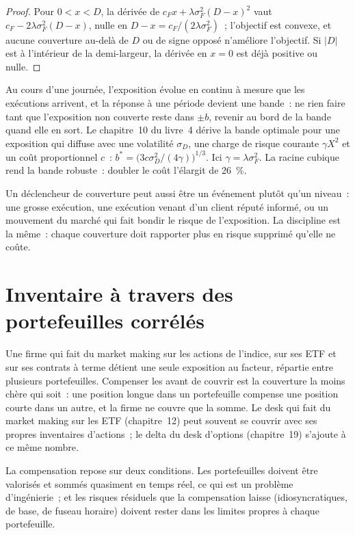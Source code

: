 \begin{proof}
Pour $0<x<D$, la dérivée de $c_Fx+\lambda\sigma_F^2(D-x)^2$ vaut $c_F-2\lambda\sigma_F^2(D-x)$, nulle en $D-x=c_F/(2\lambda\sigma_F^2)$~; l'objectif est
convexe, et aucune couverture au-delà de $D$ ou de signe opposé n'améliore l'objectif. Si $|D|$ est à l'intérieur de la demi-largeur, la dérivée en $x=0$ est déjà positive ou nulle.
\end{proof}

Au cours d'une journée, l'exposition évolue en continu à mesure que les exécutions arrivent, et la réponse à une période devient une bande~: ne rien faire tant que l'exposition non couverte reste
dans $\pm b$, revenir au bord de la bande quand elle en sort. Le chapitre~10 du livre~4 dérive la bande optimale pour une exposition qui diffuse
avec une volatilité $\sigma_D$, une charge de risque courante $\gamma X^2$ et un coût proportionnel $c$~: $b^\ast=\bigl(3c\sigma_D^2/(4\gamma)\bigr)^{1/3}$. Ici
$\gamma=\lambda\sigma_F^2$. La racine cubique rend la bande robuste~: doubler le coût l'élargit de 26~\%.

Un déclencheur de couverture peut aussi être un événement plutôt qu'un niveau~: une grosse exécution, une exécution venant d'un client réputé informé, ou un mouvement du marché qui
fait bondir le risque de l'exposition. La discipline est la même~: chaque couverture doit rapporter plus en risque supprimé qu'elle ne coûte.

\section{Inventaire à travers des portefeuilles corrélés}

Une firme qui fait du market making sur les actions de l'indice, sur ses ETF et sur ses contrats à terme détient une seule exposition au facteur, répartie entre plusieurs portefeuilles. Compenser les
 avant de couvrir est la couverture la moins chère qui soit~: une position longue dans un portefeuille compense une position courte dans un autre, et la firme ne couvre que la
somme. Le desk qui fait du market making sur les ETF (chapitre~12) peut souvent se couvrir avec ses propres inventaires d'actions~; le delta du desk d'options (chapitre~19) s'ajoute
à ce même nombre.

La compensation repose sur deux conditions. Les portefeuilles doivent être valorisés et sommés quasiment en temps réel, ce qui est un problème d'ingénierie~; et les risques résiduels
que la compensation laisse (idiosyncratiques, de base, de fuseau horaire) doivent rester dans les limites propres à chaque portefeuille.

